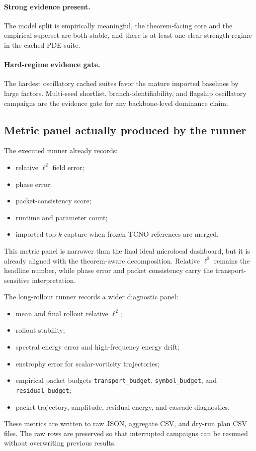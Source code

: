\paragraph{Strong evidence present.}
The model split is empirically meaningful, the theorem-facing core and the empirical superset are both stable, and there is at least one clear strength regime in the cached PDE suite.

\paragraph{Hard-regime evidence gate.}
The hardest oscillatory cached suites favor the mature imported baselines by large factors. Multi-seed shortlist, branch-identifiability, and flagship oscillatory campaigns are the evidence gate for any backbone-level dominance claim.

\subsection{Metric panel actually produced by the runner}

The executed runner already records:
\begin{itemize}
\item relative $\ell^2$ field error;
\item phase error;
\item packet-consistency score;
\item runtime and parameter count;
\item imported top-$k$ capture when frozen TCNO references are merged.
\end{itemize}

This metric panel is narrower than the final ideal microlocal dashboard, but it is already aligned with the theorem-aware decomposition. Relative $\ell^2$ remains the headline number, while phase error and packet consistency carry the transport-sensitive interpretation.

The long-rollout runner records a wider diagnostic panel:
\begin{itemize}
\item mean and final rollout relative $\ell^2$;
\item rollout stability;
\item spectral energy error and high-frequency energy drift;
\item enstrophy error for scalar-vorticity trajectories;
\item empirical packet budgets \texttt{transport\_budget}, \texttt{symbol\_budget}, and \texttt{residual\_budget};
\item packet trajectory, amplitude, residual-energy, and cascade diagnostics.
\end{itemize}
These metrics are written to raw JSON, aggregate CSV, and dry-run plan CSV files. The raw rows are preserved so that interrupted campaigns can be resumed without overwriting previous results.

